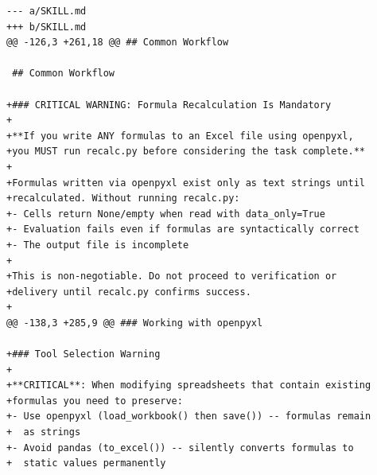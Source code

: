 \begin{tcolorbox}[
    title={\textbf{Example Stage 3 Applied Diff (excerpt from final $p^*$)}},
    colback=purple!3, colframe=purple!30, fonttitle=\small\bfseries,
    breakable, left=4pt, right=4pt, top=4pt, bottom=4pt
]
\small
\begin{lstlisting}[style=appendixprompt]
--- a/SKILL.md
+++ b/SKILL.md
@@ -126,3 +261,18 @@ ## Common Workflow

 ## Common Workflow

+### CRITICAL WARNING: Formula Recalculation Is Mandatory
+
+**If you write ANY formulas to an Excel file using openpyxl,
+you MUST run recalc.py before considering the task complete.**
+
+Formulas written via openpyxl exist only as text strings until
+recalculated. Without running recalc.py:
+- Cells return None/empty when read with data_only=True
+- Evaluation fails even if formulas are syntactically correct
+- The output file is incomplete
+
+This is non-negotiable. Do not proceed to verification or
+delivery until recalc.py confirms success.
+
@@ -138,3 +285,9 @@ ### Working with openpyxl

+### Tool Selection Warning
+
+**CRITICAL**: When modifying spreadsheets that contain existing
+formulas you need to preserve:
+- Use openpyxl (load_workbook() then save()) -- formulas remain
+  as strings
+- Avoid pandas (to_excel()) -- silently converts formulas to
+  static values permanently
\end{lstlisting}
\end{tcolorbox}
